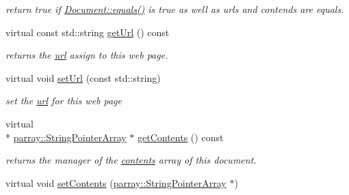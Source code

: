 \begin{DoxyCompactItemize}
\begin{DoxyCompactList}\small\item\em return true if \hyperlink{classdocs_1_1Document_ad86b3a7c7d496f3b05c740e2c1433c78}{Document\-::equals()} is true as well as urls and contends are equals. \end{DoxyCompactList}\item 
\hypertarget{classdocs_1_1WebPage_aaeac2076cad36b3dd2c3ea090e4712e0}{virtual const std\-::string \hyperlink{classdocs_1_1WebPage_aaeac2076cad36b3dd2c3ea090e4712e0}{get\-Url} () const }\label{classdocs_1_1WebPage_aaeac2076cad36b3dd2c3ea090e4712e0}

\begin{DoxyCompactList}\small\item\em returns the \hyperlink{classdocs_1_1WebPage_a4495e463a26d77b22ec4d8af690bbb11}{url} assign to this web page. \end{DoxyCompactList}\item 
\hypertarget{classdocs_1_1WebPage_a46ae47ff938c8b9a4081c17b2c307ef9}{virtual void \hyperlink{classdocs_1_1WebPage_a46ae47ff938c8b9a4081c17b2c307ef9}{set\-Url} (const std\-::string)}\label{classdocs_1_1WebPage_a46ae47ff938c8b9a4081c17b2c307ef9}

\begin{DoxyCompactList}\small\item\em set the \hyperlink{classdocs_1_1WebPage_a4495e463a26d77b22ec4d8af690bbb11}{url} for this web page \end{DoxyCompactList}\item 
\hypertarget{classdocs_1_1WebPage_ad2efbd306365a023f52c5c93caa4e638}{virtual \\*
\hyperlink{classparray_1_1StringPointerArray}{parray\-::\-String\-Pointer\-Array} $\ast$ \hyperlink{classdocs_1_1WebPage_ad2efbd306365a023f52c5c93caa4e638}{get\-Contents} () const }\label{classdocs_1_1WebPage_ad2efbd306365a023f52c5c93caa4e638}

\begin{DoxyCompactList}\small\item\em returns the manager of the \hyperlink{classdocs_1_1WebPage_a67d46a145ff4e7093fb1b8f56e539895}{contents} array of this document. \end{DoxyCompactList}\item 
\hypertarget{classdocs_1_1WebPage_a2e09e939689a61083a5037dcc7f84419}{virtual void \hyperlink{classdocs_1_1WebPage_a2e09e939689a61083a5037dcc7f84419}{set\-Contents} (\hyperlink{classparray_1_1StringPointerArray}{parray\-::\-String\-Pointer\-Array} $\ast$)}\label{classdocs_1_1WebPage_a2e09e939689a61083a5037dcc7f84419}


\end{DoxyCompactItemize}

